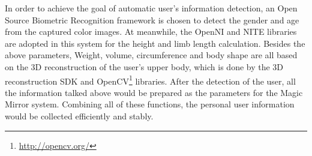 In order to achieve the goal of automatic user's information detection, an Open Source Biometric Recognition framework is chosen to detect the gender and age from the captured color images. At meanwhile, the OpenNI and NITE libraries are adopted in this system for the height and limb length calculation. Besides the above parameters, Weight, volume, circumference and body shape are all based on the 3D reconstruction of the user's upper body, which is done by the 3D reconstruction SDK and OpenCV\footnote{\url{http://opencv.org/}} libraries. 
After the detection of the user, all the information talked above would be prepared as the parameters for the Magic Mirror system. Combining all of these functions, the personal user information would be collected efficiently and stably. 


